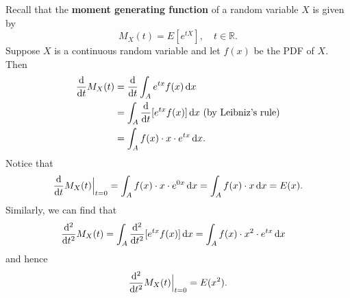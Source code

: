 \documentclass[10pt]{article}
\newcommand{\R}{\mathbb{R}}
\theoremstyle{newstyle}
\begin{document}
Recall that the {\bf moment generating function} of a random variable $X$ is given by 
\[ M_X(t) = E[e^{tX}], \quad t \in \R. \] 
Suppose $X$ is a continuous random variable and let $f(x)$ be the PDF of $X$. Then 
\begin{align*}
    \frac{{\rm d}}{{\rm d}t} M_X(t) 
    &= \frac{{\rm d}}{{\rm d}t} \int_A e^{tx} f(x) \, {\rm d}x \\
    &= \int_A \frac{{\rm d}}{{\rm d}t} [ e^{tx} f(x) ] \, {\rm d}x \text{ (by Leibniz's rule)} \\
    &= \int_A f(x) \cdot x \cdot e^{tx} \, {\rm d}x.
\end{align*}
Notice that 
\[ \frac{{\rm d}}{{\rm d}t} M_X(t) \Big|_{t=0} = \int_A f(x) \cdot x \cdot e^{0x}\, {\rm d}x 
= \int_A f(x) \cdot x\, {\rm d}x = E(x). \]
Similarly, we can find that 
\begin{align*}
    \frac{{\rm d^2}}{{\rm d}t^2} M_X(t) &= 
    \int_A \frac{{\rm d^2}}{{\rm d}t^2} [ e^{tx} f(x) ] \, {\rm d}x =
    \int_A f(x) \cdot x^2 \cdot e^{tx} \, {\rm d}x
\end{align*}
and hence
\[ \frac{{\rm d^2}}{{\rm d}t^2} M_X(t) \Big|_{t=0} = E(x^2). \]
\end{document}

